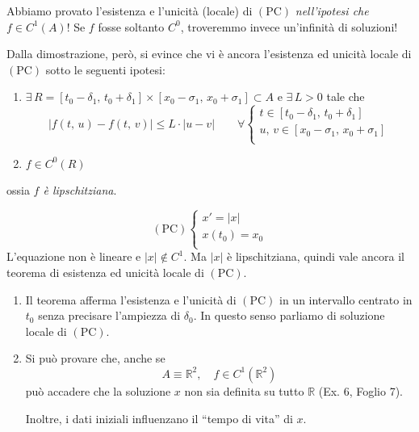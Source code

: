 \begin{obs}[importante]
Abbiamo provato l'esistenza e l'unicità (locale) di $\mathrm{(PC)}$ \emph{nell'ipotesi che} $f \in C^1(A)$! Se $f$ fosse soltanto $C^0$, troveremmo invece un'infinità di soluzioni!

Dalla dimostrazione, però, si evince che vi è ancora l'esistenza ed unicità locale di $\mathrm{(PC)}$ sotto le seguenti ipotesi:
\begin{enumerate}[labelindent=\parindent,leftmargin=*,label=\textnormal{(\roman*)},start=1]
\item $\exists \, R = [t_0-\delta_1,\,t_0+\delta_1] \times [x_0-\sigma_1,\,x_0+\sigma_1] \subset A$ e $\exists \, L > 0$ tale che
$$
|f(t,\,u) - f(t,\,v)| \leq L \cdot |u-v| \qquad \forall
\begin{cases}
t \in [t_0-\delta_1,\,t_0+\delta_1]\\
u,\,v \in [x_0-\sigma_1,\,x_0+\sigma_1]\\
\end{cases}
$$

\item $f \in C^0(R)$
\end{enumerate}
ossia \emph{$f$ è lipschitziana}.
\end{obs}

\begin{example}
$$\mathrm{(PC)}
\begin{cases}
x' = |x|\\
x(t_0) = x_0\\
\end{cases}
$$
L'equazione non è lineare e $|x| \notin C^1$. Ma $|x|$ è lipschitziana, quindi vale ancora il teorema di esistenza ed unicità locale di $\mathrm{(PC)}$.
\end{example}

\begin{obs}\mbox{}
\begin{enumerate}[labelindent=\parindent,leftmargin=*,label=\textnormal{(\roman*)},start=1]
\item Il teorema afferma l'esistenza e l'unicità di $\mathrm{(PC)}$ in un intervallo centrato in $t_0$ senza precisare l'ampiezza di $\delta_0$. In questo senso parliamo di soluzione locale di $\mathrm{(PC)}$.

\item Si può provare che, anche se
$$
A \equiv \mathbb{R}^2, \quad f \in C^1(\mathbb{R}^2)
$$
può accadere che la soluzione $x$ non sia definita su tutto $\mathbb{R}$ (Ex. 6, Foglio 7).

Inoltre, i dati iniziali influenzano il ``tempo di vita'' di $x$.
\end{enumerate}
\end{obs}

